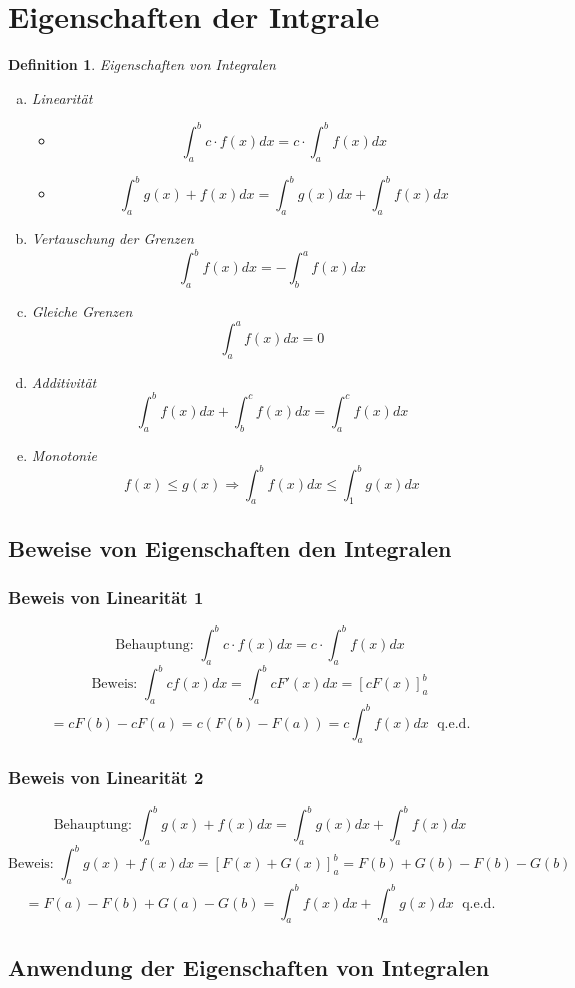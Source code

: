 \documentclass{article}
\newtheorem{definition}{Definition}
\begin{document}
\section{Eigenschaften der Intgrale}
\begin{definition}Eigenschaften von Integralen
\\
\begin{enumerate}[a)]
\item Linearität 
\begin{itemize}
\item \[\int_a^b c \cdot f(x) dx = c \cdot \int_a^b f(x) dx\]
\item \[\int_a^b g(x) + f(x) dx = \int_a^b g(x) dx + \int_a^b f(x) dx \]
\end{itemize}
\item Vertauschung der Grenzen\[ \int_a^b f(x) dx = -\int_b^a f(x) dx\]
\item Gleiche Grenzen \[\int_a^a f(x) dx = 0\]
\item Additivität \[\int_a^b f(x) dx + \int_b^c f(x) dx = \int_a^c f(x) dx\]
\item Monotonie \[f(x) \leq g(x) \Rightarrow \int_a^b f(x) dx \leq \int_1^b g(x) dx\]

\end{enumerate}

\subsection{Beweise von Eigenschaften den Integralen}
\subsubsection{Beweis von Linearität 1}

\[\text{Behauptung: } \int_a^b c \cdot f(x) dx = c \cdot \int_a^b f(x) dx\]
\[ \text{Beweis: } \int_a^b cf(x) dx = \int_a^b cF'(x) dx = [cF(x)]_a^b\]
\[ = cF(b) - cF(a) = c (F(b) - F(a)) = c \int_a^b f(x) dx \; \text{ q.e.d.}\]

\subsubsection{Beweis von Linearität 2}
\[\text{Behauptung: } \int_a^b g(x) + f(x) dx = \int_a^b g(x) dx + \int_a^b f(x) dx \]
\[ \text{Beweis: } \int_a^b g(x) + f(x) dx = [F(x) +G(x)]_a^b = F(b) +G(b) - F(b) - G(b) \]
\[= F(a) - F(b) + G(a) - G(b) = \int_a^b f(x) dx + \int_a^b g(x) dx \; \text{ q.e.d.}\]

\subsection{Anwendung der Eigenschaften von Integralen}


\end{definition}
\end{document}
